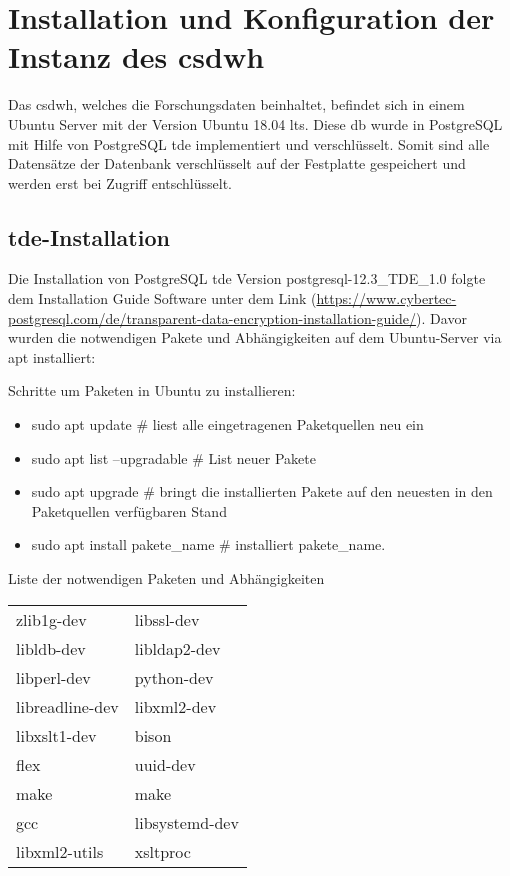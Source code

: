 \chapter{Installation und Konfiguration der Instanz des \acs{csdwh}}
    
    Das \ac{csdwh}, welches die Forschungsdaten beinhaltet, befindet sich in einem Ubuntu Server mit der Version Ubuntu 18.04 \ac{lts}. Diese \ac{db} wurde in PostgreSQL mit Hilfe von PostgreSQL \ac{tde} implementiert und verschlüsselt. Somit sind alle Datensätze der Datenbank verschlüsselt auf der Festplatte gespeichert und werden erst bei Zugriff entschlüsselt.
    
    \section{\acs{tde}-Installation}    
    
    Die Installation von PostgreSQL \ac{tde} Version postgresql-12.3\_TDE\_1.0 folgte dem Installation Guide Software unter dem Link  (\url{https://www.cybertec-postgresql.com/de/transparent-data-encryption-installation-guide/}). Davor wurden die notwendigen Pakete und Abhängigkeiten auf dem Ubuntu-Server via \textsf{apt} installiert:
    
    Schritte um Paketen in Ubuntu zu installieren:
    \begin{itemize}
    	\item sudo apt update \# liest alle eingetragenen Paketquellen neu ein
    	\item sudo apt list --upgradable \# List neuer Pakete
    	\item sudo apt upgrade \#  bringt die installierten Pakete auf den neuesten in den Paketquellen verfügbaren Stand
    	\item sudo apt install pakete\_name \# installiert pakete\_name.
    \end{itemize}
    
    Liste der notwendigen Paketen und Abhängigkeiten
    
    \begin{tabular}{ll}
    	\textsf{zlib1g-dev} & \textsf{libssl-dev} \\ 
    	\textsf{libldb-dev} & \textsf{libldap2-dev} \\
    	\textsf{libperl-dev} & \textsf{python-dev} \\
    	\textsf{libreadline-dev} & \textsf{libxml2-dev} \\
    	\textsf{libxslt1-dev} & \textsf{bison} \\
    	\textsf{flex} & \textsf{uuid-dev} \\
    	\textsf{make} & \textsf{make} \\
    	\textsf{gcc} & \textsf{libsystemd-dev} \\
    	\textsf{libxml2-utils} & \textsf{xsltproc} \\
    \end{tabular} \\
    
